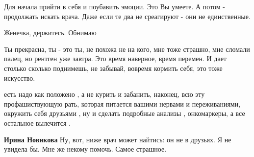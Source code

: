 \begin{itemize}
\begin{itemize}
Для начала прийти в себя и поубавить эмоции. Это Вы умеете. А потом -
продолжать искать врача. Даже если те два не среагируют - они не единственные.

\end{itemize}

 
Женечка, держитесь. Обнимаю

 

Ты прекрасна, ты - это ты, не похожа не на кого, мне тоже страшно, мне сломали
палец, но рентген уже завтра. Это время наверное, время перемен. И дает столько
сколько поднимешь, не забывай, вовремя кормить себя, это тоже искусство.


 

есть надо как положено , а не курить и забанить, наконец, всю эту
профашиствующую рать, которая питается вашими нервами и переживаниями, окружить
себя друзьями , ну и сделать подробные анализы , онкомаркеры, а все остальное
вылечится .

\begin{itemize}
 
\textbf{Ирина Новикова} Ну, вот, ниже врач может найтись: он не в друзьях. Я не увидела бы. Мне же некому помочь. Самое страшное.
\end{itemize}

 

\end{itemize}
